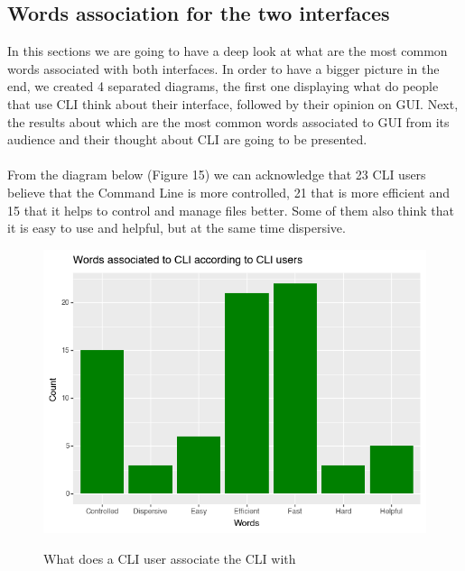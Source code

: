 \documentclass[]{report}
\begin{document}
	\subsection{Words association for the two interfaces}
	
	In this sections we are going to have a deep look at what are the most common words associated with both interfaces. In order to have a bigger picture in the end, we created 4 separated diagrams, the first one displaying what do people that use CLI think about their interface, followed by their opinion on GUI. Next, the results about which are the most common words associated to GUI from its audience and their thought about CLI are going to be presented.\\\\

	From the diagram below (Figure 15) we can acknowledge that 23 CLI users believe that the Command Line is more controlled, 21 that is more efficient and 15 that it helps to control and manage files better. Some of them also think that it is easy to use and helpful, but at the same time dispersive.
	\begin{figure}[H]
		\centering
		\includegraphics[width=0.75\linewidth]{WordsCLIFromCLI}\\
		\caption{What does a CLI user associate the CLI with}
		\label{fig: 15}
	\end{figure}
	
\end{document}
